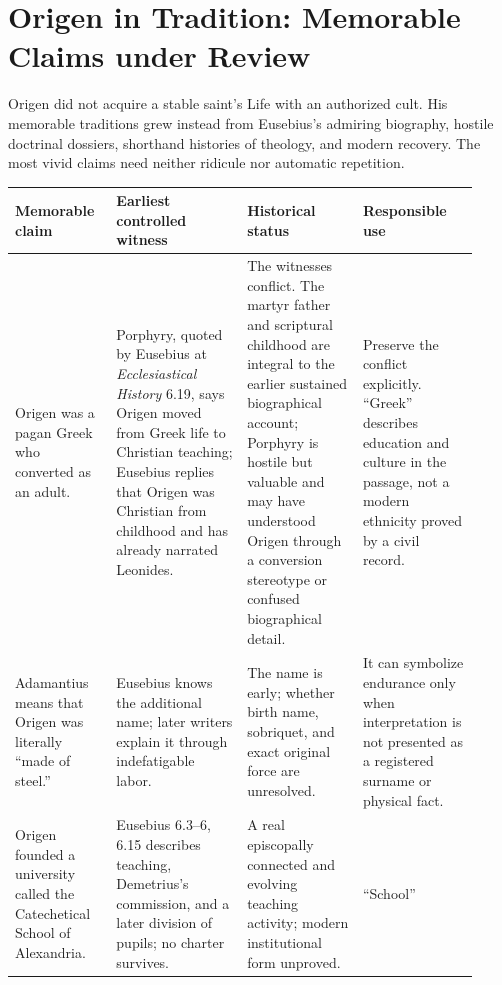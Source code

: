 \section{Origen in Tradition: Memorable Claims under Review}
\label{sec:origen-tradition}

Origen did not acquire a stable saint's Life with an authorized cult. His
memorable traditions grew instead from Eusebius's admiring biography, hostile
doctrinal dossiers, shorthand histories of theology, and modern recovery. The
most vivid claims need neither ridicule nor automatic repetition.

\begingroup
\footnotesize
\setlength{\tabcolsep}{3.5pt}
\begin{longtable}{>{\raggedright\arraybackslash}p{0.20\linewidth}
                  >{\raggedright\arraybackslash}p{0.26\linewidth}
                  >{\raggedright\arraybackslash}p{0.23\linewidth}
                  >{\raggedright\arraybackslash}p{0.23\linewidth}}
\toprule
\textbf{Memorable claim} & \textbf{Earliest controlled witness} &
\textbf{Historical status} & \textbf{Responsible use}\\
\midrule
\endhead
Origen was a pagan Greek who converted as an adult. & Porphyry, quoted by
Eusebius at \emph{Ecclesiastical History} 6.19, says Origen moved from Greek
life to Christian teaching; Eusebius replies that Origen was Christian from
childhood and has already narrated Leonides. & The witnesses conflict. The
martyr father and scriptural childhood are integral to the earlier sustained
biographical account; Porphyry is hostile but valuable and may have understood
Origen through a conversion stereotype or confused biographical detail. &
Preserve the conflict explicitly. ``Greek'' describes education and culture in
the passage, not a modern ethnicity proved by a civil record.\\
Adamantius means that Origen was literally ``made of steel.'' & Eusebius knows
the additional name; later writers explain it through indefatigable labor. &
The name is early; whether birth name, sobriquet, and exact original force are
unresolved. & It can symbolize endurance only when interpretation is not
presented as a registered surname or physical fact.\\
Origen founded a university called the Catechetical School of Alexandria. &
Eusebius 6.3--6, 6.15 describes teaching, Demetrius's commission, and a later
division of pupils; no charter survives. & A real episcopally connected and
evolving teaching activity; modern institutional form unproved. & ``School''

\end{longtable}
